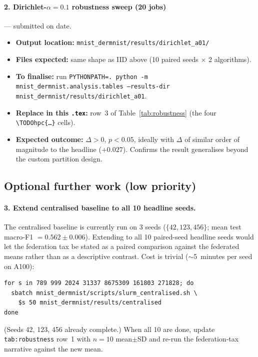 \documentclass[11pt,a4paper]{article}
\newif\ifshowtodo
\newcommand{\TODOhpc}[1]{%
  \ifshowtodo\textcolor{red}{\textbf{[HPC PENDING: #1]}}\else#1\fi}
\begin{document}
\paragraph{2. Dirichlet-$\alpha = 0.1$ robustness sweep (20 jobs)} ---
submitted on \TODOhpc{date}.
\begin{itemize}
\item \textbf{Output location:} \texttt{mnist\_dermnist/results/dirichlet\_a01/}
\item \textbf{Files expected:} same shape as IID above (10 paired seeds
  $\times$ 2 algorithms).
\item \textbf{To finalise:} run
  \texttt{PYTHONPATH=. python -m mnist\_dermnist.analysis.tables --results-dir mnist\_dermnist/results/dirichlet\_a01}.
\item \textbf{Replace in this \texttt{.tex}:} row~3 of
  Table~\ref{tab:robustness} (the four \texttt{\textbackslash TODOhpc\{\ldots\}} cells).
\item \textbf{Expected outcome:} $\Delta > 0$, $p < 0.05$, ideally with
  $\Delta$ of similar order of magnitude to the headline ($+0.027$).
  Confirms the result generalises beyond the custom partition design.
\end{itemize}

\subsection*{Optional further work (low priority)}

\paragraph{3. Extend centralised baseline to all 10 headline seeds.}
The centralised baseline is currently run on 3 seeds ($\{42, 123, 456\}$;
mean test macro-F1 $= 0.562 \pm 0.006$). Extending to all 10 paired-seed
headline seeds would let the federation tax be stated as a paired
comparison against the federated means rather than as a descriptive
contrast. Cost is trivial ($\sim$5~minutes per seed on A100):
\begin{verbatim}
for s in 789 999 2024 31337 8675309 161803 271828; do
  sbatch mnist_dermnist/scripts/slurm_centralised.sh \
    $s 50 mnist_dermnist/results/centralised
done
\end{verbatim}
(Seeds 42, 123, 456 already complete.) When all 10 are done, update
\texttt{tab:robustness} row~1 with $n = 10$ mean$\pm$SD and re-run the
federation-tax narrative against the new mean.
\end{document}

